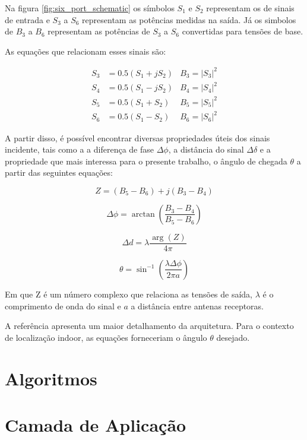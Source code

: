 Na figura \ref{fig:six_port_schematic} os símbolos \( S_1 \) e \( S_2 \) representam os de sinais de entrada e \( S_3 \) a \( S_6 \) representam as potências medidas na saída. Já os simbolos de \( B_3 \) a \( B_6 \) representam as potências de \( S_3 \) a \( S_6 \) convertidas para tensões de base.

As equações que relacionam esses sinais são:

\begin{align*}
    S_3 & = 0.5(S_1 + jS_2) & B_3 = \left | S_3 \right | ^2\\
    S_4 & = 0.5(S_1 - jS_2) & B_4 = \left | S_4 \right | ^2\\
    S_5 & = 0.5(S_1 + S_2)  & B_5 = \left | S_5 \right | ^2\\
    S_6 & = 0.5(S_1 - S_2)  & B_6 = \left | S_6 \right | ^2
\end{align*}

A partir disso, é possível encontrar diversas propriedades úteis dos sinais incidente, tais como a a diferença de fase \( \Delta\phi\), a distância do sinal \( \Delta\delta\) e a propriedade que mais interessa para o presente trabalho, o ângulo de chegada \(\theta\) a partir das seguintes equações:

\begin{equation}
    Z = (B_5 - B_6) + j(B_3 - B_4)
\end{equation}

\begin{equation}
    \Delta \phi = \arctan \left ( \frac{B_3-B_4}{B_5-B_6} \right )
\end{equation}

\begin{equation}
    \Delta d = \lambda \frac{\arg\left ({Z}  \right ) }{4\pi }
\end{equation}

\begin{equation} \label{eq:eq_AoA}
    \theta = \sin^{-1}{(\frac{\lambda \Delta \phi}{2\pi a} )}
\end{equation}

Em que Z é um número complexo que relaciona as tensões de saída, \(\lambda\) é o comprimento de onda do sinal e \(a\) a distância entre antenas receptoras.

A referência \cite{art15} apresenta um maior detalhamento da arquitetura. Para o contexto de localização indoor, as equações forneceriam o ângulo \(\theta\) desejado.

\section{Algoritmos}


\section{Camada de Aplicação}





   
   

